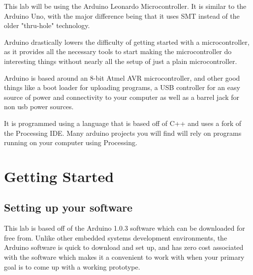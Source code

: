 \documentclass[11pt,a4paper]{article}
\begin{document}
This lab will be using the Arduino Leonardo Microcontroller\cite{leonardo}.  It is similar to the Arduino Uno\cite{uno}, with the major difference being that it uses SMT\cite{smt} instead of the older "thru-hole"\cite{th} technology.

Arduino drastically lowers the difficulty of getting started with a microcontroller, as it provides all the necessary tools to start making the microcontroller do interesting things without nearly all the setup of just a plain microcontroller.

Arduino is based around an 8-bit Atmel AVR microcontroller, and other good things like a boot loader for uploading programs, a USB controller for an easy source of power and connectivity to your computer as well as a barrel jack for non usb power sources.

It is programmed using a language that is based off of C++ and uses a fork of the Processing IDE.  Many arduino projects you will find will rely on programs running on your computer using Processing.\cite{processing}





\section{Getting Started} %
\label{sec:getting_started}

\subsection{Setting up your software} %

This lab is based off of the Arduino 1.0.3 software which can be downloaded for free from\cite{arduino-dl}.  Unlike other embedded systems development environments, the Arduino software is quick to download and set up, and has zero cost associated with the software which makes it a convenient to work with when your primary goal is to come up with a working prototype.
\end{document}
